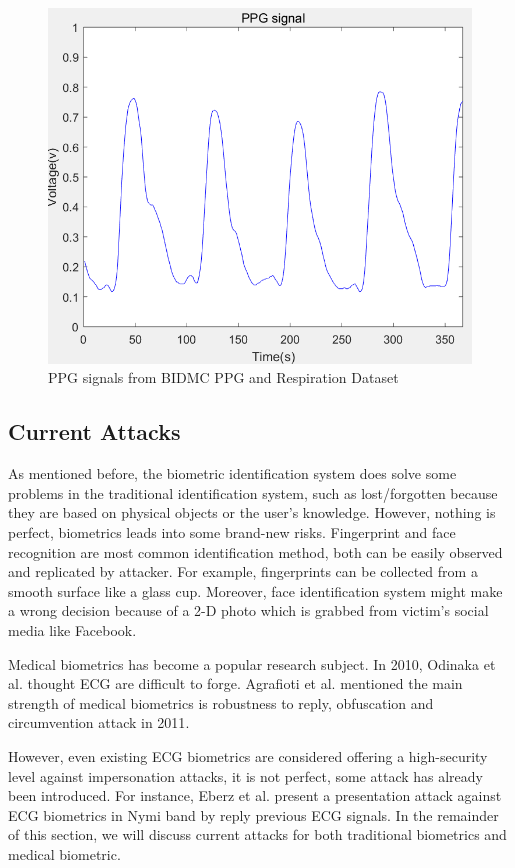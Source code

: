 \documentclass[a4paper,12pt]{article}
\begin{document}
\begin{figure}[H]
\centering
\includegraphics[width = .8\textwidth]{ppg.PNG}
\caption{PPG signals from BIDMC PPG and Respiration Dataset\autocite{PhysioNet}}
\label{fig:ppg}
\end{figure}

\subsection{Current Attacks}
As mentioned before, the biometric identification system does solve some problems in the traditional identification system, such as lost/forgotten because they are based on physical objects or the user's knowledge. However, nothing is perfect, biometrics leads into some brand-new risks. Fingerprint and face recognition are most common identification method, both can be easily observed and replicated by attacker\parencite{Eberz:2018your}. For example, fingerprints can be collected from a smooth surface like a glass cup. Moreover, face identification system might make a wrong decision because of a 2-D photo which is grabbed from victim's social media like Facebook.

Medical biometrics has become a popular research subject. In 2010, Odinaka et al. thought ECG are difficult to forge\parencite{Odinaka:2010ecg}. Agrafioti et al. mentioned the main strength of medical biometrics is robustness to reply, obfuscation and circumvention attack in 2011\parencite{Agrafioti:2011heart}.

However, even existing ECG biometrics are considered offering a high-security level against impersonation attacks\parencite{Blasco:2018feasibility}, it is not perfect, some attack has already been introduced. For instance, Eberz et al. present a presentation attack against ECG biometrics in Nymi band by reply previous ECG signals\parencite{Eberz:2017broken}. In the remainder of this section, we will discuss current attacks for both traditional biometrics and medical biometric.
\end{document}
